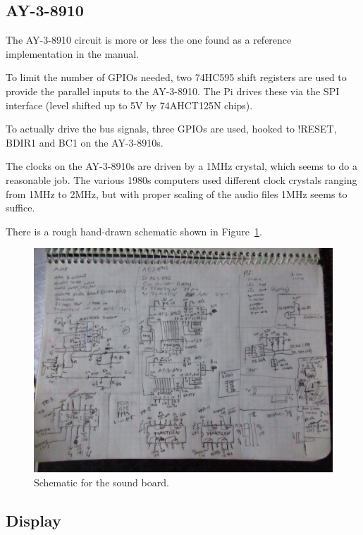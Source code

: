 \documentclass[11pt]{article}
\begin{document}
\subsection{AY-3-8910}

The AY-3-8910 circuit is more or less the one found as a reference
implementation in the manual.

To limit the number of GPIOs needed, two 74HC595 shift registers are used
to provide the parallel inputs to the AY-3-8910.
The Pi drives these via the SPI interface (level shifted up to 5V
by 74AHCT125N chips).

To actually drive the bus signals, three GPIOs are used, hooked to
!RESET, BDIR1 and BC1 on the AY-3-8910s.

The clocks on the AY-3-8910s are driven by a 1MHz crystal, which seems
to do a reasonable job.
The various 1980s computers used different clock crystals ranging from
1MHz to 2MHz, but with proper scaling of the audio files 1MHz seems
to suffice.

There is a rough hand-drawn schematic shown in Figure~\ref{figure:schematic}.

\begin{figure}[tph]
\centering
\includegraphics[angle=90,width=\columnwidth]{figs/0380_schematic.jpg}
\caption{Schematic for the sound board.~\label{figure:schematic}}
\end{figure}

\subsection{Display}
\end{document}
